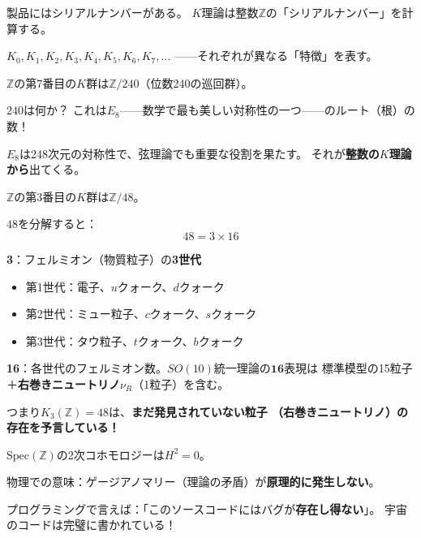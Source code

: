 \documentclass[12pt,a4paper]{article}
\begin{document}
\begin{ideabox}[シリアルナンバーのアナロジー]
製品にはシリアルナンバーがある。
$K$理論は整数$\mathbb{Z}$の「シリアルナンバー」を計算する。

$K_0, K_1, K_2, K_3, K_4, K_5, K_6, K_7, \ldots$
——それぞれが異なる「特徴」を表す。
\end{ideabox}

\begin{keybox}[$K_7(\mathbb{Z}) = \mathbb{Z}/240$と$E_8$]
$\mathbb{Z}$の第7番目の$K$群は$\mathbb{Z}/240$（位数240の巡回群）。

$240$は何か？ これは$E_8$——数学で最も美しい対称性の一つ——のルート（根）の数！

$E_8$は248次元の対称性で、弦理論でも重要な役割を果たす。
それが\textbf{整数の$K$理論から}出てくる。
\end{keybox}

\begin{keybox}[$K_3(\mathbb{Z}) = \mathbb{Z}/48$とフェルミオン]
$\mathbb{Z}$の第3番目の$K$群は$\mathbb{Z}/48$。

$48$を分解すると：
\[
  48 = 3 \times 16
\]

\textbf{3}：フェルミオン（物質粒子）の\textbf{3世代}
\begin{itemize}
\item 第1世代：電子、$u$クォーク、$d$クォーク
\item 第2世代：ミュー粒子、$c$クォーク、$s$クォーク
\item 第3世代：タウ粒子、$t$クォーク、$b$クォーク
\end{itemize}

\textbf{16}：各世代のフェルミオン数。$SO(10)$統一理論の$\mathbf{16}$表現は
標準模型の15粒子＋\textbf{右巻きニュートリノ$\nu_R$}（1粒子）を含む。

つまり$K_3(\mathbb{Z})=48$は、\textbf{まだ発見されていない粒子
（右巻きニュートリノ）の存在を予言している！}
\end{keybox}

\begin{funbox}[$H^2 = 0$：バグのない宇宙]
$\mathrm{Spec}(\mathbb{Z})$の2次コホモロジーは$H^2 = 0$。

物理での意味：ゲージアノマリー（理論の矛盾）が\textbf{原理的に発生しない}。

プログラミングで言えば：「このソースコードにはバグが\textbf{存在し得ない}」。
宇宙のコードは完璧に書かれている！
\end{funbox}

\end{document}
